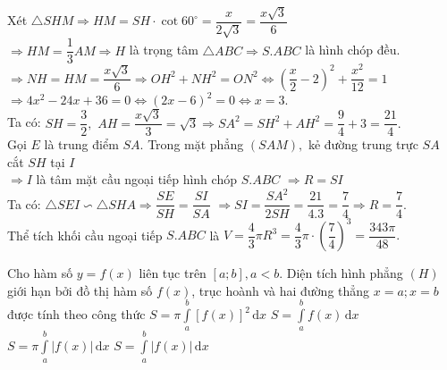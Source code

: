 \begin{ex}
{{
}
Xét $ \triangle SHM\Rightarrow HM=SH\cdot\cot 60^\circ=\dfrac{x}{2\sqrt{3}}=\dfrac{x\sqrt{3}}{6} $
\\
$ \Rightarrow HM=\dfrac{1}{3} AM\Rightarrow H $ là trọng tâm $ \triangle ABC\Rightarrow S.ABC $ là hình chóp đều.
\\
$ \Rightarrow NH=HM=\dfrac{x\sqrt{3}}{6}\Rightarrow OH^2+NH^2=ON^2\Leftrightarrow \left(\dfrac{x}{2}-2\right)^2+\dfrac{x^2}{12}=1$ 
\\
 $\Rightarrow 4x^2-24x+36=0\Leftrightarrow (2x-6)^2=0\Leftrightarrow x=3.$
\\
Ta có: $ SH=\dfrac{3}{2}, $ $ AH=\dfrac{x\sqrt{3}}{3}=\sqrt{3}\Rightarrow SA^2=SH^2+AH^2=\dfrac{9}{4}+3=\dfrac{21}{4}. $
\\
Gọi $ E $ là trung điểm $ SA. $ Trong mặt phẳng $ (SAM), $ kẻ đường trung trực $ SA $ cắt $ SH $ tại $ I $
\\
$ \Rightarrow I $ là tâm mặt cầu ngoại tiếp hình chóp $ S.ABC $
$ \Rightarrow R=SI $
\\
Ta có: $ \triangle SEI \backsim \triangle SHA\Rightarrow \dfrac{SE}{SH}=\dfrac{SI}{SA}$
$ \Rightarrow SI=\dfrac{SA^2}{2SH}=\dfrac{21}{4.3}=\dfrac{7}{4}\Rightarrow R=\dfrac{7}{4}. $
\\
Thể tích khối cầu ngoại tiếp $ S.ABC $ là $ V=\dfrac{4}{3}\pi R^3=\dfrac{4}{3}\pi \cdot \left(\dfrac{7}{4}\right)^3=\dfrac{343\pi}{48}. $
}
\end{ex}

\begin{ex}%
Cho hàm số $ y=f(x) $ liên tục trên $ [a;b], a<b.$ Diện tích hình phẳng $(H)$ giới hạn bởi đồ thị hàm số $f(x)$, trục hoành và hai đường thẳng $ x=a;x=b $ được tính theo công thức
\choice
{$ S=\pi\displaystyle\int\limits_{a}^{b} \left[f(x)\right]^2 \mathrm{\, d}x $}
{$ S=\displaystyle\int\limits_{a}^{b} f(x) \mathrm{\,d}x $}
{$ S=\pi\displaystyle\int\limits_{a}^{b} |f(x)| \mathrm{\,d}x $}
{\True $ S=\displaystyle\int\limits_{a}^{b} |f(x)| \mathrm{\,d}x $}
\end{ex}

